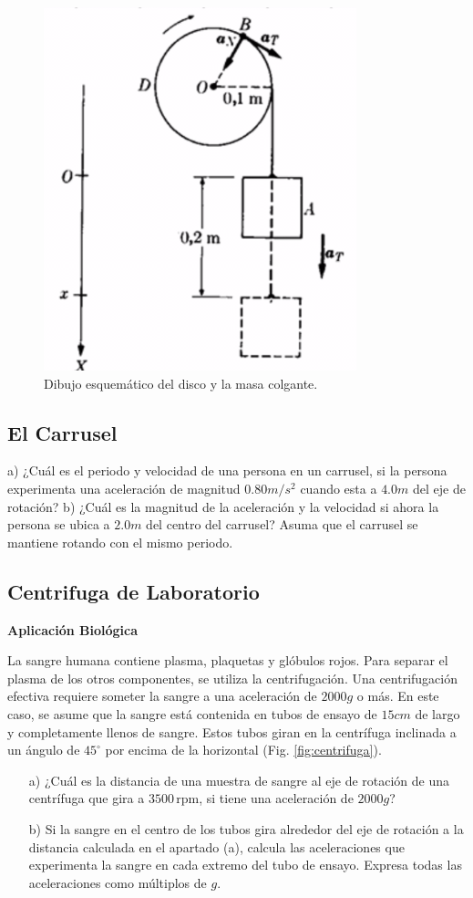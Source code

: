 \documentclass{replab}
\begin{document}
\begin{figure}[htbp]
	\centering
	\includegraphics[width=.2\columnwidth]{imagenes/disco.png}
	\caption{Dibujo esquemático del disco y la masa colgante.}
	\label{fig:disco}
\end{figure}

\subsection{El Carrusel}
a) ¿Cuál es el periodo y velocidad de una persona en un carrusel, si la persona experimenta una aceleración de magnitud $0.80m/s^2$ cuando esta a $4.0m$ del eje de rotación? b) ¿Cuál es la magnitud de la aceleración y la velocidad si ahora la persona se ubica a $2.0m$ del centro del carrusel? Asuma que el carrusel se mantiene rotando con el mismo periodo.
	
\subsection{Centrifuga de Laboratorio}
\textbf{Aplicación Biológica} 

La sangre humana contiene plasma, plaquetas y glóbulos rojos. Para separar el plasma de los otros componentes, se utiliza la centrifugación. Una centrifugación efectiva requiere someter la sangre a una aceleración de $2000g$ o más. En este caso, se asume que la sangre está contenida en tubos de ensayo de $15cm$ de largo y completamente llenos de sangre. Estos tubos giran en la centrífuga inclinada a un ángulo de $45^\circ$ por encima de la horizontal (Fig. \ref{fig:centrifuga}).


\begin{enumerate}
	\item[a)] ¿Cuál es la distancia de una muestra de sangre al eje de rotación de una centrífuga que gira a $3500\,\text{rpm}$, si tiene una aceleración de $2000g$?

	\item[b)] Si la sangre en el centro de los tubos gira alrededor del eje de rotación a la distancia calculada en el apartado (a), calcula las aceleraciones que experimenta la sangre en cada extremo del tubo de ensayo. Expresa todas las aceleraciones como múltiplos de $g$.
\end{enumerate}
\end{document}

